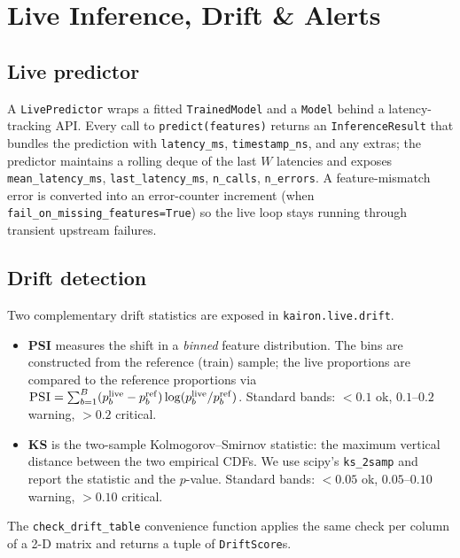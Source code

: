 \documentclass[11pt,a4paper]{article}
\let\oldsection\section
\renewcommand{\section}{\clearpage\oldsection}
\providecommand{\PSIsym}{\textsc{PSI}}
\providecommand{\KSsym}{\textsc{KS}}
\begin{document}
\section{Live Inference, Drift \& Alerts}\label{sec:live}

\subsection{Live predictor}
A \texttt{LivePredictor} wraps a fitted \texttt{TrainedModel}
and a \texttt{Model} behind a latency-tracking API. Every
call to \texttt{predict(features)} returns an
\texttt{InferenceResult} that bundles the prediction with
\texttt{latency\_ms}, \texttt{timestamp\_ns}, and any
extras; the predictor maintains a rolling deque of the
last $W$ latencies and exposes \texttt{mean\_latency\_ms},
\texttt{last\_latency\_ms}, \texttt{n\_calls},
\texttt{n\_errors}. A feature-mismatch error is converted
into an error-counter increment (when
\texttt{fail\_on\_missing\_features=True}) so the live
loop stays running through transient upstream failures.

\subsection{Drift detection}
Two complementary drift statistics are exposed in
\texttt{kairon.live.drift}.
\begin{itemize}[leftmargin=1.2em,itemsep=0.05em,topsep=0.1em]
    \item \textbf{\PSIsym{}} measures the shift in a
    \emph{binned} feature distribution. The bins are
    constructed from the reference (train) sample; the live
    proportions are compared to the reference proportions
    via
    $\PSIsym = \sum_{b=1}^{B}(p_b^{\mathrm{live}}-p_b^{\mathrm{ref}})\log(p_b^{\mathrm{live}}/p_b^{\mathrm{ref}})$.
    Standard bands: $<0.1$ ok, $0.1$--$0.2$ warning,
    $>0.2$ critical.
    \item \textbf{\KSsym{}} is the two-sample Kolmogorov--Smirnov
    statistic: the maximum vertical distance between the
    two empirical CDFs. We use scipy's
    \texttt{ks\_2samp} and report the statistic and the
    $p$-value. Standard bands: $<0.05$ ok, $0.05$--$0.10$
    warning, $>0.10$ critical.
\end{itemize}
The \texttt{check\_drift\_table} convenience function
applies the same check per column of a 2-D matrix and
returns a tuple of \texttt{DriftScore}s.
\end{document}
